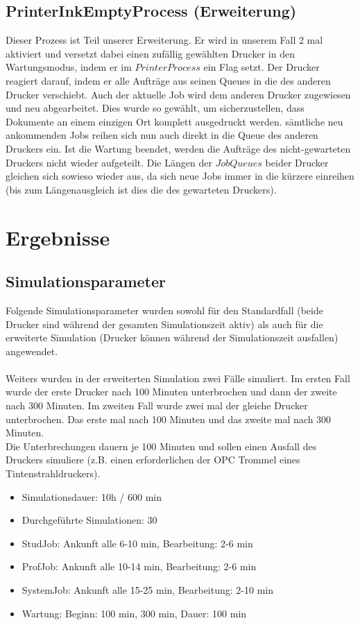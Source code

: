 \documentclass[12pt,a4paper]{article}
\begin{document}
	\subsection{PrinterInkEmptyProcess (Erweiterung)}
	Dieser Prozess ist Teil unserer Erweiterung. Er wird in unserem Fall 2 mal aktiviert und versetzt dabei einen zufällig gewählten Drucker in den Wartungsmodus, indem er im $PrinterProcess$ ein Flag setzt. 
	Der Drucker reagiert darauf, indem er alle Aufträge aus seinen Queues in die des anderen Drucker verschiebt. Auch der aktuelle Job wird dem anderen Drucker zugewiesen und neu abgearbeitet. Dies wurde 
	so gewählt, um sicherzustellen, dass Dokumente an einem einzigen Ort komplett ausgedruckt werden. sämtliche neu ankommenden Jobs reihen sich nun auch direkt in die Queue des anderen Druckers
	ein. Ist die Wartung beendet, werden die Aufträge des nicht-gewarteten Druckers nicht wieder aufgeteilt. Die Längen der $JobQueues$ beider Drucker gleichen sich sowieso wieder aus, da sich neue Jobs
	immer in die kürzere einreihen (bis zum Längenausgleich ist dies die des gewarteten Druckers).
	
	\section{Ergebnisse}
	\subsection{Simulationsparameter}
	Folgende Simulationsparameter wurden sowohl für den Standardfall (beide Drucker sind während der gesamten Simulationszeit aktiv) als auch für die erweiterte Simulation (Drucker können während der
	 Simulationszeit ausfallen) angewendet.\\
	\\
	Weiters wurden in der erweiterten Simulation zwei Fälle simuliert.
	Im ersten Fall wurde der erste Drucker nach 100 Minuten unterbrochen und dann der zweite nach 300 Minuten.
	Im zweiten Fall wurde zwei mal der gleiche Drucker unterbrochen. Das erste mal nach 100 Minuten und das zweite mal nach 300 Minuten.\\
	Die Unterbrechungen dauern je 100 Minuten und sollen einen Ausfall des Druckers simuliere (z.B. einen erforderlichen der OPC Trommel eines Tintenstrahldruckers).
	\\
	\begin{itemize}
		\item Simulationsdauer: 10h / 600 min
		\item Durchgeführte Simulationen: 30
		\item StudJob: Ankunft alle 6-10 min, Bearbeitung: 2-6 min
		\item ProfJob: Ankunft alle 10-14 min, Bearbeitung: 2-6 min
		\item SystemJob: Ankunft alle 15-25 min, Bearbeitung: 2-10 min
		\item Wartung: Beginn: 100 min, 300 min, Dauer: 100 min
	\end{itemize}	
		
\end{document}
